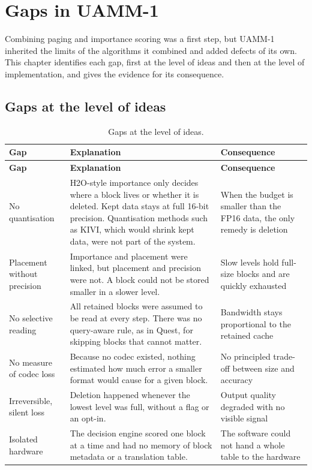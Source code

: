 \documentclass[12pt,a4paper]{report}
\begin{document}
\section{Gaps in UAMM-1}\label{sec:4}
Combining paging and importance scoring was a first step, but UAMM-1 inherited the limits of the algorithms it combined and added defects of its own. This chapter identifies each gap, first at the level of ideas and then at the level of implementation, and gives the evidence for its consequence.

\subsection{Gaps at the level of ideas}\label{sec:4_1}
{\fontsize{8}{9.5}\selectfont\setlength{\tabcolsep}{3pt}
\begin{longtable}{>{\raggedright\arraybackslash}p{1.25in}>{\raggedright\arraybackslash}p{2.94in}>{\raggedright\arraybackslash}p{1.78in}}
\caption{Gaps at the level of ideas.}\\
\toprule
\textbf{Gap} & \textbf{Explanation} & \textbf{Consequence} \\\midrule\endfirsthead
\toprule \textbf{Gap} & \textbf{Explanation} & \textbf{Consequence} \\\midrule\endhead
\bottomrule\endfoot
No quantisation & H2O-style importance only decides where a block lives or whether it is deleted. Kept data stays at full 16-bit precision. Quantisation methods such as KIVI, which would shrink kept data, were not part of the system. & When the budget is smaller than the FP16 data, the only remedy is deletion \\
Placement without precision & Importance and placement were linked, but placement and precision were not. A block could not be stored smaller in a slower level. & Slow levels hold full-size blocks and are quickly exhausted \\
No selective reading & All retained blocks were assumed to be read at every step. There was no query-aware rule, as in Quest, for skipping blocks that cannot matter. & Bandwidth stays proportional to the retained cache \\
No measure of codec loss & Because no codec existed, nothing estimated how much error a smaller format would cause for a given block. & No principled trade-off between size and accuracy \\
Irreversible, silent loss & Deletion happened whenever the lowest level was full, without a flag or an opt-in. & Output quality degraded with no visible signal \\
Isolated hardware & The decision engine scored one block at a time and had no memory of block metadata or a translation table. & The software could not hand a whole table to the hardware \\
\bottomrule
\end{longtable}}
\end{document}
